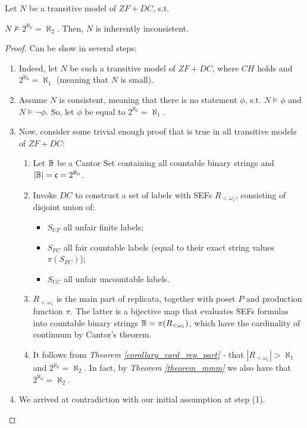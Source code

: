 \begin{theorem}\label{theorem_inconsistent_small_zfdc}
    Let $N$ be a transitive model of $ZF+DC$, s.t. \item $N \not\models 2^{\aleph_0} = \aleph_2$.
    Then, $N$ is inherently inconsistent.
\end{theorem}
\begin{proof}
    Can be show in several steps:
    \begin{enumerate}
        \item Indeed, let $N$ be such a transitive model of $ZF+DC$, where $CH$ holds and $2^{\aleph_0} = \aleph_1$ (meaning that $N$ is small). 
        \item Assume $N$ is consistent, meaning that there is no statement $\phi$, s.t. $N \models \phi$ and $N \models \neg \phi$. So, let $\phi$ be equal to $2^{\aleph_0} = \aleph_1$.
        \item Now, consider some trivial enough proof that is true in all transitive models of $ZF+DC$:
            \begin{enumerate}
                \item Let $\mathbb{B}$ be a Cantor Set containing all countable binary strings and $|\mathbb{B}| = \mathfrak{c} = 2^{\aleph_0}$.
                \item Invoke $DC$ to construct a set of labels with SEFs $R_{<\omega_1}$, consisting of disjoint union of:
                \begin{itemize}
                    \item $S_{UF}$ all unfair finite labels; 
                    \item $S_{FC}$ all fair countable labels (equal to their exact string values $\pi(S_{FC})$);
                    \item $S_{UC}$ all unfair uncountable labels.
                \end{itemize}
                \item $R_{<\omega_1}$ is the main part of replicata, together with poset $P$ and production function $\pi$. The latter is a bijective map that evaluates SEFs formulas into countable binary strings $\mathbb{B} = \pi(R_{<\omega_1})$, which have the cardinality of continuum by Cantor's theorem.
                \item It follows from \textit{Theorem \ref{corollary_card_rep_part} - } that $|R_{<\omega_1}| > \aleph_1$ and $2^{\aleph_0} = \aleph_2$. In fact, by \textit{Theorem \ref{theorem_mmm}} we also have that $2^{\aleph_0} = \aleph_2$.
            \end{enumerate}
        \item We arrived at contradiction with our initial assumption at step (1).
    \end{enumerate}
\end{proof}
